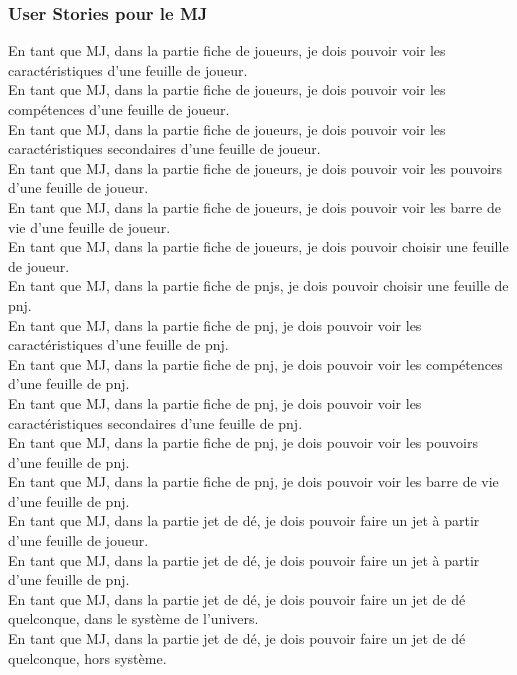 \subsubsection{User Stories pour le MJ}

En tant que MJ, dans la partie fiche de joueurs, je dois pouvoir voir les
caractéristiques d'une feuille de joueur.\\

En tant que MJ, dans la partie fiche de joueurs, je dois pouvoir voir les
compétences d'une feuille de joueur.\\

En tant que MJ, dans la partie fiche de joueurs, je dois pouvoir voir les
caractéristiques secondaires d'une feuille de joueur.\\

En tant que MJ, dans la partie fiche de joueurs, je dois pouvoir voir les
pouvoirs d'une feuille de joueur.\\

En tant que MJ, dans la partie fiche de joueurs, je dois pouvoir voir les
barre de vie d'une feuille de joueur.\\

En tant que MJ, dans la partie fiche de joueurs, je dois pouvoir choisir une
feuille de joueur.\\

En tant que MJ, dans la partie fiche de pnjs, je dois pouvoir choisir une
feuille de pnj.\\

En tant que MJ, dans la partie fiche de pnj, je dois pouvoir voir les
caractéristiques d'une feuille de pnj.\\

En tant que MJ, dans la partie fiche de pnj, je dois pouvoir voir les
compétences d'une feuille de pnj.\\

En tant que MJ, dans la partie fiche de pnj, je dois pouvoir voir les
caractéristiques secondaires d'une feuille de pnj.\\

En tant que MJ, dans la partie fiche de pnj, je dois pouvoir voir les
pouvoirs d'une feuille de pnj.\\

En tant que MJ, dans la partie fiche de pnj, je dois pouvoir voir les
barre de vie d'une feuille de pnj.\\

En tant que MJ, dans la partie jet de dé, je dois pouvoir faire un jet à partir
d'une feuille de joueur.\\

En tant que MJ, dans la partie jet de dé, je dois pouvoir faire un jet à partir
d'une feuille de pnj.\\

En tant que MJ, dans la partie jet de dé, je dois pouvoir faire un jet de dé
quelconque, dans le système de l'univers.\\

En tant que MJ, dans la partie jet de dé, je dois pouvoir faire un jet de dé
quelconque, hors système.\\